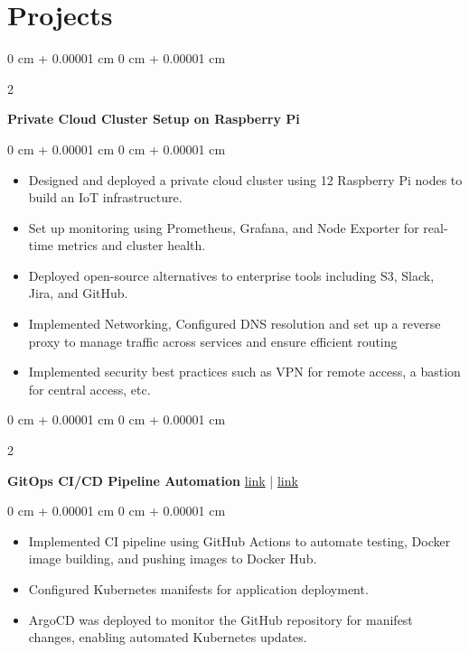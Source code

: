 \documentclass[10pt, letterpaper]{article}
\newenvironment{highlights}{
    \begin{itemize}[
        topsep=0.10 cm,
        parsep=0.10 cm,
        partopsep=0pt,
        itemsep=0pt,
        leftmargin=0 cm + 10pt
    ]
}{
    \end{itemize}
} %
\newenvironment{onecolentry}{
    \begin{adjustwidth}{
        0 cm + 0.00001 cm
    }{
        0 cm + 0.00001 cm
    }
}{
    \end{adjustwidth}
} %
\newenvironment{twocolentry}[2][]{
    \onecolentry
    \def\secondColumn{#2}
    \setcolumnwidth{\fill, 4.5 cm}
    \begin{paracol}{2}
}{
    \switchcolumn \raggedleft \secondColumn
    \end{paracol}
    \endonecolentry
} %
\begin{document}
    \section{Projects}

        \begin{twocolentry}{
        }
            \textbf{Private Cloud Cluster Setup on Raspberry Pi}\end{twocolentry}

        \vspace{0.10 cm}
        \begin{onecolentry}
            \begin{highlights}
                \item Designed and deployed a private cloud cluster using 12 Raspberry Pi nodes to build an IoT infrastructure.
                \item Set up monitoring using Prometheus, Grafana, and Node Exporter for real-time metrics and cluster health.
                \item Deployed open-source alternatives to enterprise tools including S3, Slack, Jira, and GitHub.
                \item Implemented Networking, Configured DNS resolution and set up a reverse proxy to manage traffic across services and ensure efficient routing
                \item Implemented security best practices such as VPN for remote access, a bastion for central access, etc.
            \end{highlights}
        \end{onecolentry}


        \vspace{0.2 cm}

        \begin{twocolentry}{
        \href{https://github.com/Charan-Sharan/CRUD}{link} | \href{https://github.com/Charan-Sharan/gitops}{link}
        }
            \textbf{GitOps CI/CD Pipeline Automation}\end{twocolentry}

        \vspace{0.10 cm}
        \begin{onecolentry}
            \begin{highlights}
                \item Implemented CI pipeline using GitHub Actions to automate testing, Docker image building, and pushing images to Docker Hub.
                \item Configured Kubernetes manifests for application deployment.
                \item ArgoCD was deployed to monitor the GitHub repository for manifest changes, enabling automated Kubernetes updates.
            \end{highlights}
        \end{onecolentry}
\end{document}
